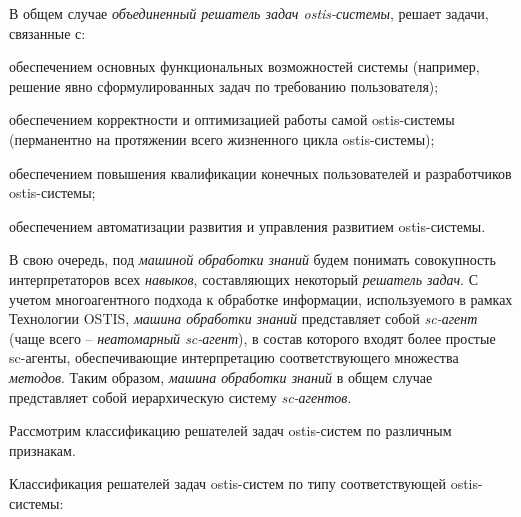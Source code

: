 В общем случае \textit{объединенный решатель задач ostis-системы}, решает задачи, связанные с:
\begin{textitemize}
	\item обеспечением основных функциональных возможностей системы (например, решение явно сформулированных задач по требованию пользователя);
	\item обеспечением корректности и оптимизацией работы самой ostis-системы (перманентно на протяжении всего жизненного цикла ostis-системы);
	\item обеспечением повышения квалификации конечных пользователей и разработчиков ostis-системы;
	\item обеспечением автоматизации развития и управления развитием ostis-системы.
\end{textitemize}

В свою очередь, под \textit{машиной обработки знаний} будем понимать совокупность интерпретаторов всех \textit{навыков}, составляющих некоторый \textit{решатель задач}. С учетом многоагентного подхода к обработке информации, используемого в рамках Технологии OSTIS, \textit{машина обработки знаний} представляет собой \textit{sc-агент} (чаще всего -- \textit{неатомарный sc-агент}), в состав которого входят более простые sc-агенты, обеспечивающие интерпретацию соответствующего множества \textit{методов}. Таким образом, \textit{машина обработки знаний} в общем случае представляет собой иерархическую систему \textit{sc-агентов}.

\begin{SCn}
\end{SCn}

Рассмотрим классификацию решателей задач ostis-систем по различным признакам.

Классификация решателей задач ostis-систем по типу соответствующей ostis-системы:

